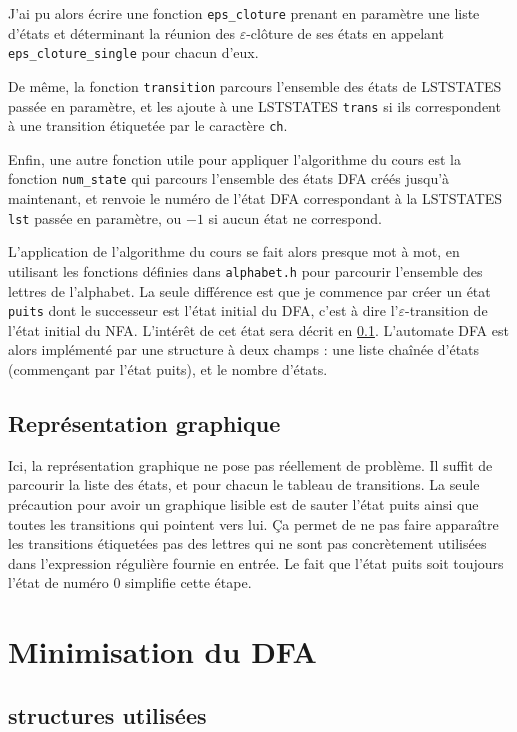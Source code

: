 \documentclass[12pt, a4paper]{article}
\begin{document}
J'ai pu alors écrire une fonction \texttt{eps\_cloture} prenant en paramètre une liste d'états et déterminant la réunion des $\varepsilon$-clôture de ses états en appelant \texttt{eps\_cloture\_single} pour chacun d'eux.

De même, la fonction \texttt{transition} parcours l'ensemble des états de LSTSTATES passée en paramètre, et les ajoute à une LSTSTATES \texttt{trans} si ils correspondent à une transition étiquetée par le caractère \texttt{ch}.

Enfin, une autre fonction utile pour appliquer l'algorithme du cours est la fonction \texttt{num\_state} qui parcours l'ensemble des états DFA créés jusqu'à maintenant, et renvoie le numéro de l'état DFA correspondant à la LSTSTATES \texttt{lst} passée en paramètre, ou $-1$ si aucun état ne correspond. 

L'application de l'algorithme du cours se fait alors presque mot à mot, en utilisant les fonctions définies dans \texttt{alphabet.h} pour parcourir l'ensemble des lettres de l'alphabet. La seule différence est que je commence par créer un état \texttt{puits} dont le successeur est l'état initial du DFA, c'est à dire l'$\varepsilon$-transition de l'état initial du NFA. L'intérêt de cet état sera décrit en \ref{dfa_graph}. L'automate DFA est alors implémenté par une structure à deux champs : une liste chaînée d'états (commençant par l'état puits), et le nombre d'états.


\subsection{Représentation graphique}
\label{dfa_graph}

Ici, la représentation graphique ne pose pas réellement de problème. Il suffit de parcourir la liste des états, et pour chacun le tableau de transitions. La seule précaution pour avoir un graphique lisible est de sauter l'état puits ainsi que toutes les transitions qui pointent vers lui. Ça permet de ne pas faire apparaître les transitions étiquetées pas des lettres qui ne sont pas concrètement utilisées dans l'expression régulière fournie en entrée. Le fait que l'état puits soit toujours l'état de numéro 0 simplifie cette étape.

\section{Minimisation du DFA}

\subsection{structures utilisées}
\end{document}
